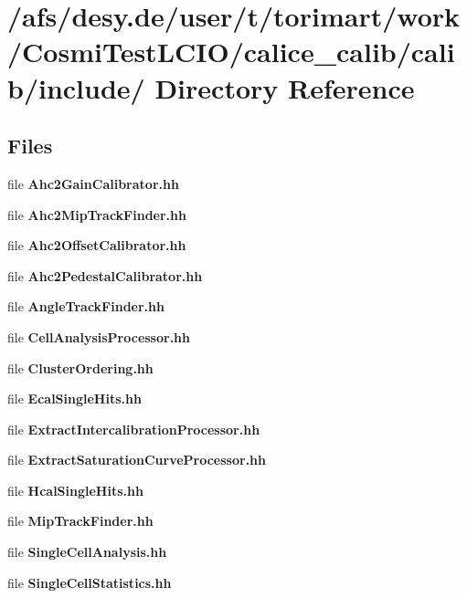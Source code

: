 \section{/afs/desy.de/user/t/torimart/work/CosmiTestLCIO/calice\_\-calib/calib/include/ Directory Reference}
\label{dir_9e7c06d954ef6129845f39531c559d54}
\subsection*{Files}
\begin{DoxyCompactItemize}
\item 
file {\bfseries Ahc2GainCalibrator.hh}
\item 
file {\bfseries Ahc2MipTrackFinder.hh}
\item 
file {\bfseries Ahc2OffsetCalibrator.hh}
\item 
file {\bfseries Ahc2PedestalCalibrator.hh}
\item 
file {\bfseries AngleTrackFinder.hh}
\item 
file {\bfseries CellAnalysisProcessor.hh}
\item 
file {\bfseries ClusterOrdering.hh}
\item 
file {\bfseries EcalSingleHits.hh}
\item 
file {\bfseries ExtractIntercalibrationProcessor.hh}
\item 
file {\bfseries ExtractSaturationCurveProcessor.hh}
\item 
file {\bfseries HcalSingleHits.hh}
\item 
file {\bfseries MipTrackFinder.hh}
\item 
file {\bfseries SingleCellAnalysis.hh}
\item 
file {\bfseries SingleCellStatistics.hh}
\end{DoxyCompactItemize}
